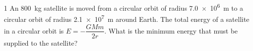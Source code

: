 \begin{practiceq}{1}{}
An \qty{800}{kg} satellite is moved from a circular orbit of radius \qty{7.0e6}{m} to a circular
orbit of radius \qty{2.1e7}{m} around Earth. The total energy of a satellite in a circular orbit is
$E = -\dfrac{GMm}{2r}$. What is the minimum energy that must be supplied to the satellite?
\end{practiceq}

